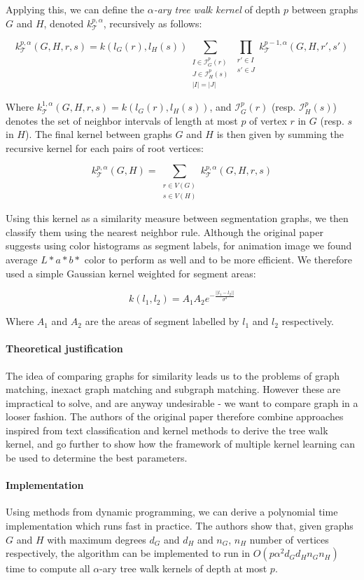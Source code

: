 Applying this, we can define the \emph{$\alpha$-ary tree walk kernel} of depth $p$ between graphs $G$ and $H$, denoted $k^{p, \alpha}_{\mathcal{T}}$, recursively as follows:

\[
k^{p, \alpha}_{\mathcal{T}}(G,H,r,s) = k(l_G(r), l_H(s)) \sum_{\substack{I \in \mathcal{I}_G^p(r)\\ J \in \mathcal{I}_H^p(s)\\ |I| = |J|}} \prod_{\substack{r' \in I \\ s' \in J}} k^{p - 1, \alpha}_{\mathcal{T}}(G,H,r',s')
\]

Where $k^{1, \alpha}_{\mathcal{T}}(G,H,r,s) = k(l_G(r), l_H(s))$, and $\mathcal{I}_G^p(r)$ (resp. $\mathcal{I}_H^p(s)$) denotes the set of neighbor intervals of length at most $p$ of vertex $r$ in $G$ (resp. $s$ in $H$). The final kernel between graphs $G$ and $H$ is then given by summing the recursive kernel for each pairs of root vertices:

\[
k^{p, \alpha}_{\mathcal{T}}(G,H) = \sum_{\substack{r \in V(G)\\ s \in V(H)}} k^{p, \alpha}_{\mathcal{T}}(G,H,r,s)
\]

Using this kernel as a similarity measure between segmentation graphs, we then classify them using the nearest neighbor rule. Although the original paper suggests using color histograms as segment labels, for animation image we found average $L*a*b*$ color to perform as well and to be more efficient. We therefore used a simple Gaussian kernel weighted for segment areas:

\[
k(l_1,l_2) = A_1A_2e^{-\frac{||l_1 - l_2||}{\sigma^2}}
\]

Where $A_1$ and $A_2$ are the areas of segment labelled by $l_1$ and $l_2$ respectively.

\paragraph{Theoretical justification} The idea of comparing graphs for similarity leads us to the problems of graph matching, inexact graph matching and subgraph matching. However these are impractical to solve, and are anyway undesirable - we want to compare graph in a looser fashion. The authors of the original paper therefore combine approaches inspired from text classification and kernel methods to derive the tree walk kernel, and go further to show how the framework of multiple kernel learning can be used to determine the best parameters.

\paragraph{Implementation} Using methods from dynamic programming, we can derive a polynomial time implementation which runs fast in practice. The authors show that, given graphs $G$ and $H$ with maximum degrees $d_G$ and $d_H$ and $n_G$, $n_H$ number of vertices respectively, the algorithm can be implemented to run in $O(p\alpha^2d_Gd_Hn_Gn_H)$ time to compute all $\alpha$-ary tree walk kernels of depth at most $p$.

